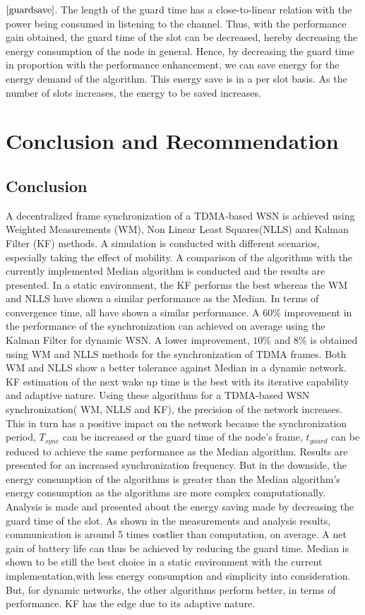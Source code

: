 \documentclass[a4paper,10pt]{report}
\begin{document}
$\ref{guardsave}$. The length of the guard time has a close-to-linear relation with the power being consumed in listening to the channel.
Thus, with the performance gain obtained, the guard time of the slot can be decreased, hereby decreasing the energy consumption of the node in general. Hence, by decreasing the guard time in proportion with the performance enhancement, we can save energy for the energy demand of the algorithm. This energy save is in a per slot basis. As the number of slots increases, the energy to be saved increases.
\chapter{\textbf{Conclusion and Recommendation}}
\section{Conclusion}\noindent
A decentralized frame synchronization of a TDMA-based WSN is achieved using Weighted Measurements (WM), Non Linear Least Squares(NLLS) and Kalman Filter (KF) methods. A simulation is conducted with different scenarios, especially taking the effect of mobility. A comparison of the algorithms with the currently implemented Median algorithm is conducted and the results are presented.
\newline
In a static environment, the KF performs the best whereas the WM and NLLS have shown a similar performance as the Median. In terms of convergence time, all have shown a similar performance.
\newline
A $60\%$ improvement in the performance of the synchronization can achieved on average using the Kalman Filter for dynamic WSN. A lower improvement, $10\%$ and $8\%$ is obtained using WM and NLLS methods for the synchronization of TDMA frames. Both WM and NLLS show a better tolerance against Median in a dynamic network. KF estimation of the next wake up time is the best with its iterative capability and adaptive nature.
\newline
Using these algorithms for a TDMA-based WSN synchronization( WM, NLLS and KF), the precision of the network increases. This in turn has a positive impact on the network because the synchronization period, $T_{sync}$ can be increased or the guard time of the node's frame, $t_{guard}$ can be reduced to achieve the same performance as the Median algorithm. Results are presented for an increased synchronization frequency.
\newline
But in the downside, the energy consumption of the algorithms is greater than the Median algorithm's energy consumption as the algorithms are more complex computationally. Analysis is made and presented about the energy saving made by decreasing the guard time of the slot. As shown in the measurements and analysis results, communication is around 5 times costlier than computation, on average. A net gain of battery life can thus be achieved by reducing the guard time.
\newline
Median is shown to be still the best choice in a static environment with the current implementation,with less energy consumption and simplicity into consideration. But, for dynamic networks, the other algorithms perform better, in terms of performance. KF has the edge due to its adaptive nature.
\end{document}
